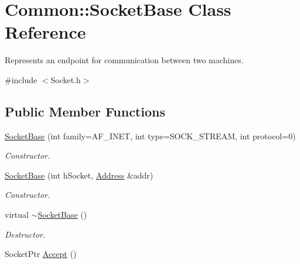 \hypertarget{class_common_1_1_socket_base}{\section{Common\-:\-:Socket\-Base Class Reference}
\label{class_common_1_1_socket_base}
}


Represents an endpoint for communication between two machines.  




{\ttfamily \#include $<$Socket.\-h$>$}

\subsection*{Public Member Functions}
\begin{DoxyCompactItemize}
\item 
\hyperlink{class_common_1_1_socket_base_a7dc95f4ca43f1d674b79efb1a6a43e68}{Socket\-Base} (int family=A\-F\-\_\-\-I\-N\-E\-T, int type=S\-O\-C\-K\-\_\-\-S\-T\-R\-E\-A\-M, int protocol=0)
\begin{DoxyCompactList}\small\item\em Constructor. \end{DoxyCompactList}\item 
\hyperlink{class_common_1_1_socket_base_a0519076dcfe1c83d4eefc081e072d3b1}{Socket\-Base} (int h\-Socket, \hyperlink{class_common_1_1_address}{Address} \&addr)
\begin{DoxyCompactList}\small\item\em Constructor. \end{DoxyCompactList}\item 
\hypertarget{class_common_1_1_socket_base_a3ee0c99be6b08809491108d120404973}{virtual \hyperlink{class_common_1_1_socket_base_a3ee0c99be6b08809491108d120404973}{$\sim$\-Socket\-Base} ()}\label{class_common_1_1_socket_base_a3ee0c99be6b08809491108d120404973}

\begin{DoxyCompactList}\small\item\em Destructor. \end{DoxyCompactList}\item 
\hypertarget{class_common_1_1_socket_base_acc7a3a7e0d0e440d405ae432310e4a0b}{Socket\-Ptr \hyperlink{class_common_1_1_socket_base_acc7a3a7e0d0e440d405ae432310e4a0b}{Accept} ()}\label{class_common_1_1_socket_base_acc7a3a7e0d0e440d405ae432310e4a0b}


\end{DoxyCompactItemize}
